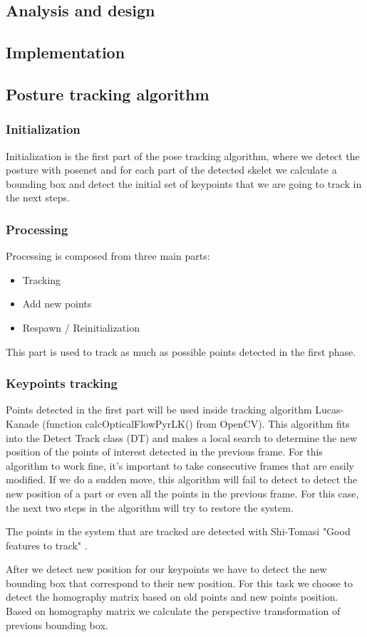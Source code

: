 \subsection{Analysis and design}
\subsection{Implementation}
\subsection{Posture tracking algorithm}

\subsubsection{Initialization}
Initialization is the first part of the pose tracking algorithm, where we detect the posture with posenet and for each part of the detected skelet we calculate a bounding box and detect the initial set of keypoints that we are going to track in the next steps.
\subsubsection{Processing}
Processing is composed from three main parts: 
\begin{itemize}
    \item Tracking 
    \item Add new points 
    \item Respawn / Reinitialization
\end{itemize}
This part is used to track as much as possible points detected in the first phase.

\subsubsection{Keypoints tracking}
\par Points detected in the first part will be used inside tracking algorithm Lucas-Kanade \cite{Lucas:1981:IIR:1623264.1623280} (function calcOpticalFlowPyrLK() from OpenCV). This algorithm fits into the Detect Track  class (DT) and makes a local search to determine the new position of the points of interest detected in the previous frame. For this algorithm to work fine, it's important to take consecutive frames that are easily modified. If we do a sudden move, this algorithm will fail to detect to detect the new position of a part or even all the points in the previous frame. For this case, the next two steps in the algorithm will try to restore the system. 
\par The points in the system that are tracked are detected with Shi-Tomasi "Good features to track" \cite{323798}. 
\par After we detect new position for our keypoints we have to detect the new bounding box that correspond to their new position. For this task we choose to detect the homography matrix based on old points and new points position. Based on homography matrix we calculate the perspective transformation of previous bounding box.

